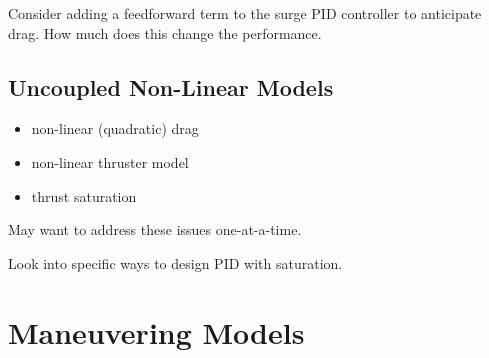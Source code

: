 \documentclass[11pt,draftcls,journal,onecolumn]{../latexlib/latex_ieee/IEEEtran}
\begin{document}
Consider adding a feedforward term to the surge PID controller to anticipate drag.  How much does this change the performance.


\subsection{Uncoupled Non-Linear Models}

\begin{itemize}
\item non-linear (quadratic) drag
\item non-linear thruster model
\item thrust saturation
\end{itemize}
May want to address these issues one-at-a-time.

Look into specific ways to design PID with saturation.









\section{Maneuvering Models}
\end{document}

